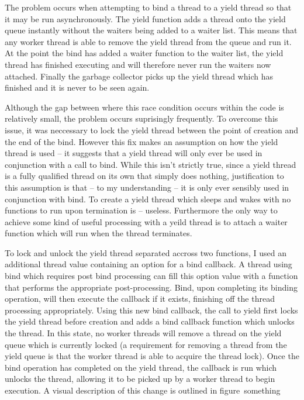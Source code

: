 \documentclass[12pt,twoside,notitlepage]{report}
\begin{document}
The problem occurs when attempting to bind a thread to a yield thread so that it may be run asynchronously. The yield function adds a thread onto the yield queue instantly without the waiters being added to a waiter list. This means
that any worker thread is able to remove the yield thread from the queue and run it. At the point the bind has added a waiter function to the waiter list, the yield thread has finished executing and will therefore never run the
waiters now attached. Finally the garbage collector picks up the yield thread which has finished and it is never to be seen again. 

%
%
Although the gap between where this race condition occurs within the code is relatively small, the problem occurs suprisingly frequently. To overcome this issue, it was neccessary to lock the yield thread between the point of creation
and the end of the bind. However this fix makes an assumption on how the yield thread is used -- it suggests that a yield thread will only ever be used in conjunction with a call to bind. While this isn't strictly true, since a yield
thread is a fully qualified thread on its own that simply does nothing, justification to this assumption is that -- to my understanding -- it is only ever sensibly used in conjunction with bind. To create a yield thread which sleeps
and wakes with no functions to run upon termination is -- useless. Furthermore the only way to achieve some kind of useful processing with a yeild thread is to attach a waiter function which will run when the thread terminates.

To lock and unlock the yield thread separated accross two functions, I used an additional thread value containing an option for a bind callback. A thread using bind which requires post bind processing can fill this option value with
a function that performs the appropriate post-processing. Bind, upon completing its binding operation, will then execute the callback if it exists, finishing off the thread processing appropriately. Using this new bind callback, the
call to yield first locks the yield thread before creation and adds a bind callback function which unlocks the thread. In this state, no worker threads will remove a thread on the yield queue which is currently locked (a requirement
for removing a thread from the yield queue is that the worker thread is able to acquire the thread lock). Once the bind operation has completed on the yield thread, the callback is run which unlocks the thread, allowing it to be
picked up by a worker thread to begin execution. A visual description of this change is outlined in figure~something
\end{document}
